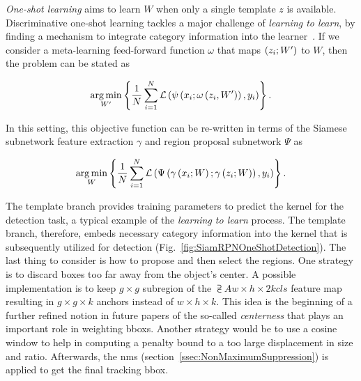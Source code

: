 \noindent \emph{One-shot learning} aims to learn $W$ when only a single template $z$ is available.
Discriminative one-shot learning tackles a major challenge of \emph{learning to learn}, by finding a mechanism to integrate category information into the learner~\cite{Bertinetto2016OneShot}. If we consider a meta-learning feed-forward function $\omega$ that maps $\left( {z_i; W'} \right)$ to $W$, then the problem can be stated as

\begin{equation}
    \label{eq:SiamRPNOneShotMetaLearning}
    \underset{W'}{\operatorname*{arg\,min}}
    \left\{ {
        \frac{1}{N}
        \sum_{i = 1}^{N}
        {\mathcal{L}} \left( 
            {\psi} \left( x_i; {\omega} \left( z_i, W' \right) \right),
            y_i
         \right)
    } \right\}.
\end{equation}

\noindent In this setting, this objective function can be re-written in terms of the Siamese subnetwork feature extraction $\gamma$ and region proposal subnetwork $\Psi$ as

\begin{equation}
    \label{eq:SiamRPNOneShoCombo}
    \underset{W}{\operatorname*{arg\,min}}
    \left\{ {
        \frac{1}{N}
        \sum_{i = 1}^{N}
        {\mathcal{L}} \left( 
            {\Psi} \left( {\gamma} \left( x_i; W \right); {\gamma} \left( z_i; W \right) \right),
            y_i
         \right)
    } \right\}.
\end{equation}

\noindent The template branch provides training parameters to predict the kernel for the detection task, a typical example of the \emph{learning to learn} process. The template branch, therefore, embeds necessary category information into the kernel that is subsequently utilized for detection (Fig.~\ref{fig:SiamRPNOneShotDetection}). The last thing to consider is how to propose and then select the regions. One strategy is to discard boxes too far away from the object's center. A possible implementation is to keep $g \times g$ subregion of the $\supsub{A}{w \times h \times 2k}{cls}$ feature map resulting in $g \times g \times k$ anchors instead of $w \times h \times k$. This idea is the beginning of a further refined notion in future papers of the so-called \emph{centerness} that plays an important role in weighting \glspl{bbox}. Another strategy would be to use a cosine window to help in computing a penalty bound to a too large displacement in size and ratio. Afterwards, the \gls{nms} (section~\ref{ssec:NonMaximumSuppression}) is applied to get the final tracking \gls{bbox}.


